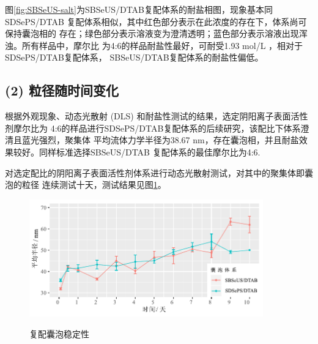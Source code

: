 \documentclass[bachelor,fandolfonts,replaceperiod]{jnuthesis}
\begin{document}
    图\ref{fig:SBSeUS-salt}为SBSeUS/DTAB复配体系的耐盐相图，现象基本同SDSePS/DTAB
    复配体系相似，其中红色部分表示在此浓度的存在下，体系尚可保持囊泡相的
    存在；绿色部分表示溶液变为澄清透明；蓝色部分表示溶液出现浑浊。所有样品中，摩尔比
    为4:6的样品耐盐性最好，可耐受1.93 mol/L ，相对于SDSePS/DTAB复配体系，
    SBSeUS/DTAB复配体系的耐盐性偏低。
    
    \subsection*{(2) 粒径随时间变化}
    根据外观现象、动态光散射 (DLS) 和耐盐性测试的结果，选定阴阳离子表面活性剂摩尔比为
    4:6的样品进行SDSePS/DTAB复配体系的后续研究，该配比下体系澄清且蓝光强烈，聚集体
    平均流体力学半径为38.67 nm，存在囊泡相，并且耐盐效果较好。同样标准选择SBSeUS/DTAB
    复配体系的最佳摩尔比为4:6.
    
    对选定配比的阴阳离子表面活性剂体系进行动态光散射测试，对其中的聚集体即囊泡的粒径
    连续测试十天，测试结果见图\ref{fig:vesicle-time-stability}。
    \begin{figure}[htbp]
        \centering
        \includegraphics[width=0.9\textwidth]{figure/vesicle-time-stability.pdf}\\
        \caption{复配囊泡稳定性}\label{fig:vesicle-time-stability}
    \end{figure}
\end{document}
